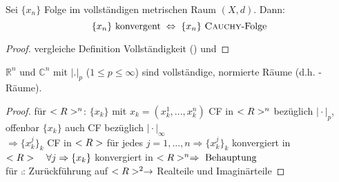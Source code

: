 \begin{conclusion}
	Sei $\{x_n\}$ Folge im vollständigen metrischen Raum $(X,d)$. Dann:\[ \{x_n\}\text{ konvergent}\;\Leftrightarrow\; \{x_n\} \text{ \textsc{Cauchy}-Folge} \]
\end{conclusion}
\begin{proof}
	vergleiche Definition Vollständigkeit () und 
\end{proof}

\begin{theorem}
	$\mathbb{R}^n$ und $\mathbb{C}^n$ mit $|.|_p$ ($1\le p \le \infty$) sind vollständige, normierte Räume (d.h. -Räume).
\end{theorem}
\begin{proof}
	für $<R>^n$: $\{x_k\}$ mit $x_k=(x^1_k,...,x^n_k)$ CF in $<R>^n$ bezüglich $\vert\cdot\vert_p$, offenbar $\{x_k\}$ auch CF bezüglich $\vert\cdot\vert_\infty$ \\
	$\Rightarrow \{x^j_k\}_k$ CF in $<R>$ für jedes $j=1,...,n\Rightarrow \{x^j_k\}_k$ konvergiert in $<R>\quad\forall j\Rightarrow \{x_k\}$ konvergiert in $<R>^n\Rightarrow \text{ Behauptung}$ \\
	für $\comp$: Zurückführung auf $<R>^2\to$ Realteile und Imaginärteile
\end{proof}